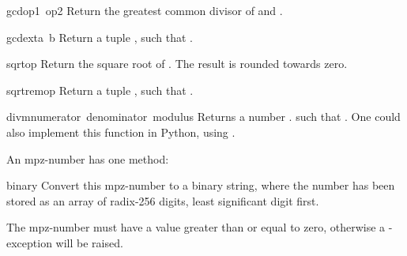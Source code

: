 \begin{funcdesc}{gcd}{op1\, op2}
  Return the greatest common divisor of  and .
\end{funcdesc}

\begin{funcdesc}{gcdext}{a\, b}
  Return a tuple , such that
  .
\end{funcdesc}

\begin{funcdesc}{sqrt}{op}
  Return the square root of . The result is rounded towards zero.
\end{funcdesc}

\begin{funcdesc}{sqrtrem}{op}
  Return a tuple , such that
  .
\end{funcdesc}

\begin{funcdesc}{divm}{numerator\, denominator\, modulus}
  Returns a number . such that
  .
  One could also implement this function in Python, using .
\end{funcdesc}

An mpz-number has one method:

\begin{funcdesc}{binary}{}
  Convert this mpz-number to a binary string, where the number has been
  stored as an array of radix-256 digits, least significant digit first.

  The mpz-number must have a value greater than or equal to zero,
  otherwise a -exception will be raised.
\end{funcdesc}
